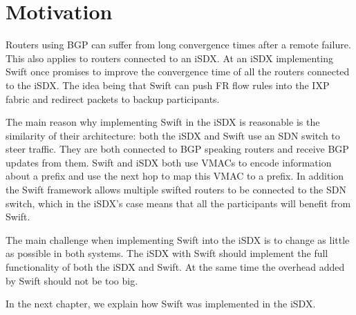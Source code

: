 
\chapter{\label{chapter3}Motivation}

Routers using BGP can suffer from long convergence times after a remote failure. This also applies to routers connected to an iSDX. At an iSDX implementing Swift once promises to improve the convergence time of all the routers connected to the iSDX. 
The idea being that Swift can push FR flow rules into the IXP fabric and redirect packets to backup participants.

The main reason why implementing Swift in the iSDX is reasonable is the similarity of their architecture: both the iSDX and Swift use an SDN switch to steer traffic. They are both connected to BGP speaking routers and receive BGP updates from them. Swift and iSDX both use VMACs to encode information about a prefix and use the next hop to map this VMAC to a prefix. In addition the Swift framework allows multiple swifted routers to be connected to the SDN switch, which in the iSDX's case means that all the participants will benefit from Swift.

The main challenge when implementing Swift into the iSDX is to change as little as possible in both systems. The iSDX with Swift should implement the full functionality of both the iSDX and Swift. At the same time the overhead added by Swift should not be too big.

In the next chapter, we explain how Swift was implemented in the iSDX. 
